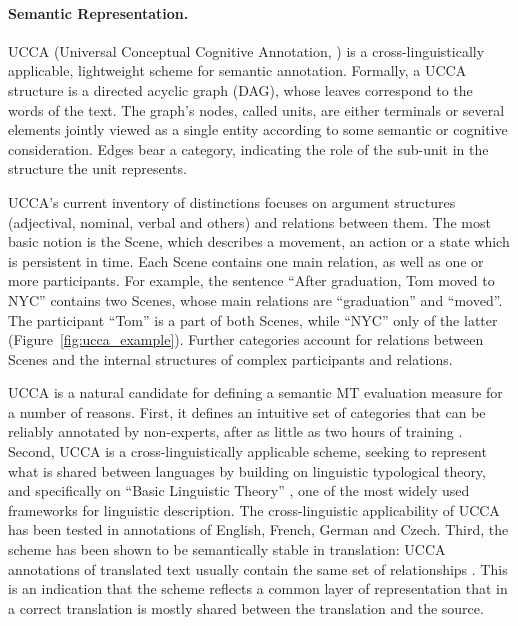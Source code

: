 \documentclass[11pt]{article}
\newcommand{\figref}[1]{Figure~\ref{#1}}
\def\inparcite#1{\newcite{#1}}
\begin{document}
\paragraph{Semantic Representation.}
UCCA (Universal Conceptual Cognitive Annotation, \inparcite{abend2013universal}) is a
cross-linguistically applicable, lightweight
scheme for semantic annotation. Formally, a UCCA structure is a directed acyclic graph (DAG),
whose leaves correspond to the words of the text.
The graph's nodes, called {\sc units}, are either terminals or several elements jointly
viewed as a single entity according to some semantic or cognitive consideration. Edges bear
a category, indicating the role of the sub-unit in the structure the unit
represents.

UCCA's current inventory of distinctions focuses on argument structures
(adjectival, nominal, verbal and others) and relations between them.
The most basic notion is the Scene, which describes a movement, an
action or a state which is persistent in time. Each Scene contains one main relation, as well
as one or more participants. For example, the sentence ``After graduation, Tom moved to NYC''
contains two Scenes, whose main relations are ``graduation'' and ``moved''.
The participant ``Tom'' is a part of both Scenes, while ``NYC'' only of the
latter (\figref{fig:ucca_example}). Further categories account for
relations between Scenes and the internal structures of complex participants and relations.

UCCA is a natural candidate for defining a semantic
MT evaluation measure for a number of reasons. 
First, it defines an intuitive set of categories
that can be reliably annotated by non-experts, after as little as two hours
of training \cite{marinotti2014}.
Second, UCCA is a cross-linguistically applicable scheme, seeking to
represent what is shared between languages
by building on linguistic typological theory, and specifically on ``Basic Linguistic Theory''
\cite{Dixon:10a,Dixon:10b,Dixon:12}, one of the most widely used frameworks for linguistic description.
The cross-linguistic applicability of UCCA has been tested in annotations of
English, French, German and Czech.
Third, the scheme has been shown to be semantically stable
in translation: UCCA annotations of translated text usually contain the same set of relationships
\cite{sulem2015conceptual}. This is an indication that the scheme reflects
a common layer of representation that in a correct translation
is mostly shared between the translation and the source. 
\end{document}
